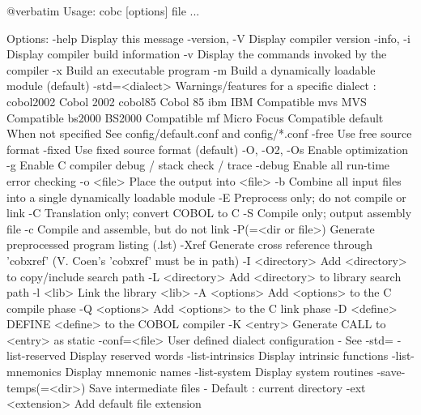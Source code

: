 @verbatim
Usage: cobc [options] file ...

Options:
  -help                 Display this message
  -version, -V          Display compiler version
  -info, -i             Display compiler build information
  -v                    Display the commands invoked by the compiler
  -x                    Build an executable program
  -m                    Build a dynamically loadable module (default)
  -std=<dialect>        Warnings/features for a specific dialect :
                          cobol2002   Cobol 2002
                          cobol85     Cobol 85
                          ibm         IBM Compatible
                          mvs         MVS Compatible
                          bs2000      BS2000 Compatible
                          mf          Micro Focus Compatible
                          default     When not specified
                        See config/default.conf and config/*.conf
  -free                 Use free source format
  -fixed                Use fixed source format (default)
  -O, -O2, -Os          Enable optimization
  -g                    Enable C compiler debug / stack check / trace
  -debug                Enable all run-time error checking
  -o <file>             Place the output into <file>
  -b                    Combine all input files into a single
                        dynamically loadable module
  -E                    Preprocess only; do not compile or link
  -C                    Translation only; convert COBOL to C
  -S                    Compile only; output assembly file
  -c                    Compile and assemble, but do not link
  -P(=<dir or file>)    Generate preprocessed program listing (.lst)
  -Xref                 Generate cross reference through 'cobxref'
                        (V. Coen's 'cobxref' must be in path)
  -I <directory>        Add <directory> to copy/include search path
  -L <directory>        Add <directory> to library search path
  -l <lib>              Link the library <lib>
  -A <options>          Add <options> to the C compile phase
  -Q <options>          Add <options> to the C link phase
  -D <define>           DEFINE <define> to the COBOL compiler
  -K <entry>            Generate CALL to <entry> as static
  -conf=<file>          User defined dialect configuration - See -std=
  -list-reserved        Display reserved words
  -list-intrinsics      Display intrinsic functions
  -list-mnemonics       Display mnemonic names
  -list-system          Display system routines
  -save-temps(=<dir>)   Save intermediate files
                        - Default : current directory
  -ext <extension>      Add default file extension

